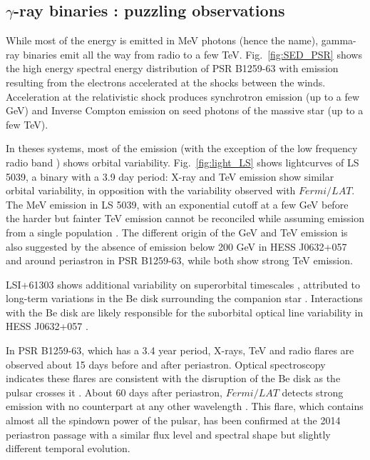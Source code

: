 \subsection {$\gamma$-ray binaries : puzzling observations}
While most of the energy is emitted in MeV photons (hence the name), gamma-ray binaries emit all the way from radio to a few TeV. Fig.~\ref{fig:SED_PSR} shows the high energy spectral energy distribution of PSR B1259-63 with emission resulting from the electrons accelerated at the shocks between the winds. Acceleration at the relativistic shock produces synchrotron emission (up to a few GeV) and Inverse Compton emission on seed photons of the massive star (up to a few TeV).   


In theses systems, most of the emission (with the exception of the low frequency radio band \citep{2015MNRAS.451...59M}) shows orbital variability. {\cblue Fig.~\ref{fig:light_LS}} shows lightcurves of LS 5039, a binary with a 3.9 day period:  X-ray and TeV emission show similar orbital variability, in opposition with the variability observed with $Fermi/LAT$.  The MeV emission in LS 5039, with an exponential cutoff at a few GeV before the harder but fainter TeV emission cannot be reconciled while assuming emission from a single population \citep{2008A&A...477..691D}. The different origin of the GeV and TeV emission is also suggested by the absence of emission below 200 GeV  in HESS J0632+057  \citep{2016arXiv160108216M} and around periastron in PSR B1259-63, while both show strong TeV emission.  

 LSI+61303 shows additional variability on superorbital timescales \citep{2012ApJ...747L..29C}, attributed to long-term variations in the Be disk surrounding the companion star \citep{2015A&A...575L...6P}. Interactions with the Be disk are likely responsible for the suborbital optical line variability in HESS J0632+057 \citep{2015ApJ...804L..32M}. 

In PSR B1259-63, which has a 3.4 year period, X-rays, TeV and radio flares are observed about 15 days before and after periastron. Optical spectroscopy indicates these flares are consistent with the disruption of the Be disk as the pulsar crosses it \citep{2016MNRAS.455.3674V}.  About 60 days after periastron, $Fermi/LAT$ detects strong emission with no counterpart at any other wavelength \citep{2011ApJ...736L..11A}.  This flare, which contains almost all the spindown power of the pulsar,  has been confirmed at the 2014 periastron passage \citep{2015ApJ...811...68C} with a similar flux level and spectral shape but slightly different temporal evolution.  



